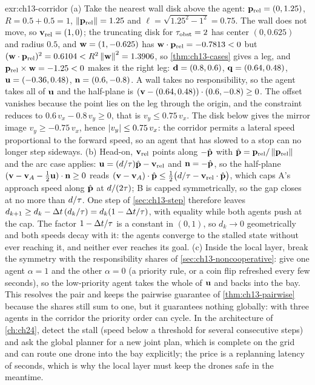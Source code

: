 \begin{solution}{exr:ch13-corridor}
(a) Take the nearest wall disk above the agent: $\mathbf{p}_{\mathrm{rel}} = (0, 1.25)$, $R = 0.5 + 0.5 = 1$, $\left\lVert \mathbf{p}_{\mathrm{rel}} \right\rVert = 1.25$ and $\ell = \sqrt{1.25^2 - 1^2} = 0.75$. The wall does not move, so $\mathbf{v}_{\mathrm{rel}} = (1,0)$; the truncating disk for $\tau_{\mathrm{obst}} = 2$ has center $(0, 0.625)$ and radius $0.5$, and $\mathbf{w} = (1, -0.625)$ has $\mathbf{w}\cdot\mathbf{p}_{\mathrm{rel}} = -0.7813 < 0$ but $(\mathbf{w}\cdot\mathbf{p}_{\mathrm{rel}})^2 = 0.6104 < R^2\left\lVert \mathbf{w} \right\rVert^2 = 1.3906$, so \cref{thm:ch13-cases} gives a leg, and $\mathbf{p}_{\mathrm{rel}} \times \mathbf{w} = -1.25 < 0$ makes it the right leg: $\mathbf{d} = (0.8, 0.6)$, $\mathbf{q} = (0.64, 0.48)$, $\mathbf{u} = (-0.36, 0.48)$, $\mathbf{n} = (0.6, -0.8)$. A wall takes no responsibility, so the agent takes all of $\mathbf{u}$ and the half-plane is $(\mathbf{v} - (0.64, 0.48))\cdot(0.6, -0.8) \ge 0$. The offset vanishes because the point lies on the leg through the origin, and the constraint reduces to $0.6\,v_x - 0.8\,v_y \ge 0$, that is $v_y \le 0.75\,v_x$. The disk below gives the mirror image $v_y \ge -0.75\,v_x$, hence $\left\lvert v_y \right\rvert \le 0.75\,v_x$: the corridor permits a lateral speed proportional to the forward speed, so an agent that has slowed to a stop can no longer step sideways.
(b) Head-on, $\mathbf{v}_{\mathrm{rel}}$ points along $-\hat{\mathbf{p}}$ with $\hat{\mathbf{p}} = \mathbf{p}_{\mathrm{rel}}/\left\lVert \mathbf{p}_{\mathrm{rel}} \right\rVert$ and the arc case applies: $\mathbf{u} = (d/\tau)\hat{\mathbf{p}} - \mathbf{v}_{\mathrm{rel}}$ and $\mathbf{n} = -\hat{\mathbf{p}}$, so the half-plane $(\mathbf{v} - \mathbf{v}_A - \tfrac12\mathbf{u})\cdot\mathbf{n} \ge 0$ reads $(\mathbf{v} - \mathbf{v}_A)\cdot\hat{\mathbf{p}} \le \tfrac12\bigl(d/\tau - \mathbf{v}_{\mathrm{rel}}\cdot\hat{\mathbf{p}}\bigr)$, which caps A's approach speed along $\hat{\mathbf{p}}$ at $d/(2\tau)$; B is capped symmetrically, so the gap closes at no more than $d/\tau$. One step of \cref{sec:ch13-step} therefore leaves $d_{k+1} \ge d_k - \Delta t\,(d_k/\tau) = d_k(1 - \Delta t/\tau)$, with equality while both agents push at the cap. The factor $1 - \Delta t/\tau$ is a constant in $(0,1)$, so $d_k \to 0$ geometrically and both speeds decay with it: the agents converge to the stalled state without ever reaching it, and neither ever reaches its goal.
(c) Inside the local layer, break the symmetry with the responsibility shares of \cref{sec:ch13-noncooperative}: give one agent $\alpha = 1$ and the other $\alpha = 0$ (a priority rule, or a coin flip refreshed every few seconds), so the low-priority agent takes the whole of $\mathbf{u}$ and backs into the bay. This resolves the pair and keeps the pairwise guarantee of \cref{thm:ch13-pairwise} because the shares still sum to one, but it guarantees nothing globally: with three agents in the corridor the priority order can cycle. In the architecture of \cref{ch:ch24}, detect the stall (speed below a threshold for several consecutive steps) and ask the global planner for a new joint plan, which is complete on the grid and can route one drone into the bay explicitly; the price is a replanning latency of seconds, which is why the local layer must keep the drones safe in the meantime.
\end{solution}
